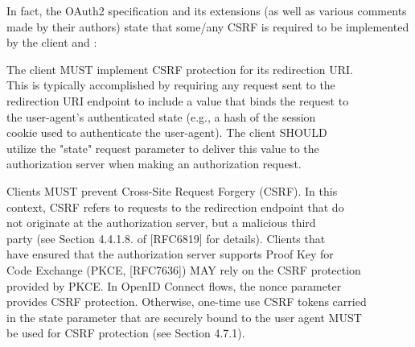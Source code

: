 \documentclass{article}
\begin{document}
{\par{In fact, the OAuth2 specification and its extensions (as well as various comments made by their authors) state that some/any CSRF is required to be implemented by the client \cite{oauth-csrf} and \cite{oauth-redirect-flow-protection}:}
\begin{displayquote}
	The client MUST implement CSRF protection for its redirection URI. \\
	This is typically accomplished by requiring any request sent to the \\
	redirection URI endpoint to include a value that binds the request to \\ 
	the user-agent's authenticated state (e.g., a hash of the session \\
	cookie used to authenticate the user-agent).  The client SHOULD \\
	utilize the "state" request parameter to deliver this value to the \\
	authorization server when making an authorization request. \\
\end{displayquote}
\begin{displayquote}
	Clients MUST prevent Cross-Site Request Forgery (CSRF). In this \\
	context, CSRF refers to requests to the redirection endpoint that do \\
	not originate at the authorization server, but a malicious third \\
	party (see Section 4.4.1.8. of [RFC6819] for details). Clients that \\
	have ensured that the authorization server supports Proof Key for \\
	Code Exchange (PKCE, [RFC7636]) MAY rely on the CSRF protection \\
	provided by PKCE. In OpenID Connect flows, the nonce parameter \\
	provides CSRF protection. Otherwise, one-time use CSRF tokens carried \\
	in the state parameter that are securely bound to the user agent MUST \\
	be used for CSRF protection (see Section 4.7.1).
\end{displayquote}

}
\end{document}
